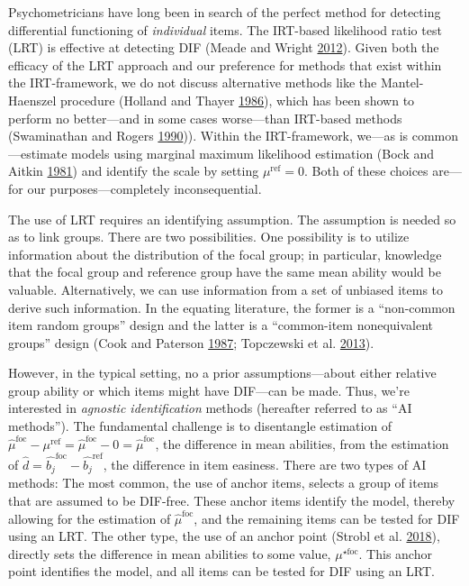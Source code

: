 \documentclass[
  11pt,
]{article}
\begin{document}
Psychometricians have long been in search of the perfect method for detecting differential functioning of \emph{individual} items. The IRT-based likelihood ratio test (LRT) is effective at detecting DIF (Meade and Wright \protect\hyperlink{ref-meade2012solving}{2012}). Given both the efficacy of the LRT approach and our preference for methods that exist within the IRT-framework, we do not discuss alternative methods like the Mantel-Haenszel procedure (Holland and Thayer \protect\hyperlink{ref-holland1986differential}{1986}), which has been shown to perform no better---and in some cases worse---than IRT-based methods (Swaminathan and Rogers \protect\hyperlink{ref-swaminathan1990detecting}{1990})). Within the IRT-framework, we---as is common---estimate models using marginal maximum likelihood estimation (Bock and Aitkin \protect\hyperlink{ref-bock1981marginal}{1981}) and identify the scale by setting \(\mu^\text{ref} = 0\). Both of these choices are---for our purposes---completely inconsequential.

The use of LRT requires an identifying assumption. The assumption is needed so as to link groups. There are two possibilities. One possibility is to utilize information about the distribution of the focal group; in particular, knowledge that the focal group and reference group have the same mean ability would be valuable. Alternatively, we can use information from a set of unbiased items to derive such information. In the equating literature, the former is a \enquote{non-common item random groups} design and the latter is a \enquote{common-item nonequivalent groups} design (Cook and Paterson \protect\hyperlink{ref-cook1987problems}{1987}; Topczewski et al. \protect\hyperlink{ref-topczewski2013comparison}{2013}).

However, in the typical setting, no a prior assumptions---about either relative group ability or which items might have DIF---can be made. Thus, we're interested in \emph{agnostic identification} methods (hereafter referred to as \enquote{AI methods}). The fundamental challenge is to disentangle estimation of \(\hat\mu^\text{foc} - \mu^\text{ref} = \hat\mu^\text{foc} - 0 = \hat\mu^\text{foc}\), the difference in mean abilities, from the estimation of \(\hat d = \hat{b_j}^{\text{foc}} - \hat{b_j}^{\text{ref}}\), the difference in item easiness. There are two types of AI methods: The most common, the use of anchor items, selects a group of items that are assumed to be DIF-free. These anchor items identify the model, thereby allowing for the estimation of \(\hat\mu^\text{foc}\), and the remaining items can be tested for DIF using an LRT. The other type, the use of an anchor point (Strobl et al. \protect\hyperlink{ref-strobl2018anchor}{2018}), directly sets the difference in mean abilities to some value, \(\mu^{\star\text{foc}}\). This anchor point identifies the model, and all items can be tested for DIF using an LRT.
\end{document}
